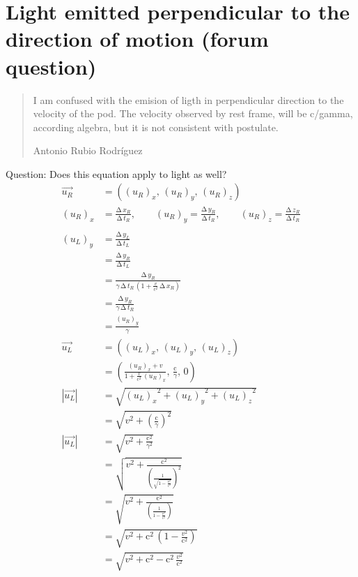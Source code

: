 \documentclass[pagesize,headsepline,10pt,parskip=half]{scrreprt}
\newcommand*\mdelta[1]{\ensuremath{\mathrm{\Delta\,}#1}}
\newcommand{\const}[1]{\mathrm{#1}}
\renewcommand{\c}{\const{c}}
\begin{document}
    \section{Light emitted perpendicular to the direction of motion (forum question)}
      \blockquote[Antonio Rubio Rodríguez]{I am confused with the emision of ligth in perpendicular direction to the velocity of the pod. The velocity observed by rest frame, will be c/gamma, according algebra, but it is not consistent with postulate.}

      Question: Does this equation apply to light as well?
      \begin{align*}
        \vec{u_R} &= \left({(u_R)}_x, \, {(u_R)}_y, \, {(u_R)}_z\right)\\
        {(u_R)}_x &= \frac{\mdelta{x_R}}{\mdelta{t_R}}, \qquad
        {(u_R)}_y = \frac{\mdelta{y_R}}{\mdelta{t_R}}, \qquad
        {(u_R)}_z = \frac{\mdelta{z_R}}{\mdelta{t_R}}\\
        \\
        {(u_L)}_y &= \frac{\mdelta{y_L}}{\mdelta{t_L}}\\
          &= \frac{\mdelta{y_R}}{\mdelta{t_L}}\\
          &= \frac{\mdelta{y_R}}{\gamma \, \mdelta{t_R} \, \left(1 + \frac{v}{\c^2} \, \mdelta{x_R}\right)}\\
          &= \frac{\mdelta{y_R}}{\gamma \, \mdelta{t_R}}\\
          &= \frac{{(u_R)}_y}{\gamma}\\
        \vec{u_L}
          &= \left({(u_L)}_x, \, {(u_L)}_y, \, {(u_L)}_z\right)\\
          &= \left(\frac{{(u_R)}_x + v}{1 + \frac{v}{\c^2} \, {(u_R)}_x}, \, \frac{\c}{\gamma}, \, 0\right)\\
        \left|\vec{u_L}\right|
          &= \sqrt{{{(u_L)}_x}^2 + {{(u_L)}_y}^2 + {{(u_L)}_z}^2}\\
          &= \sqrt{v^2 + {\left(\frac{\c}{\gamma}\right)}^2}\\
        \left|\vec{u_L}\right|
          &= \sqrt{v^2 + \frac{\c^2}{{\gamma}^2}}\\
          &= \sqrt{v^2 + \frac{\c^2}{{\left(\frac{1}{\sqrt{1 - \frac{v^2}{\c^2}}}\right)}^2}}\\
          &= \sqrt{v^2 + \frac{\c^2}{\left(\frac{1}{1 - \frac{v^2}{\c^2}}\right)}}\\
          &= \sqrt{v^2 + \c^2 \, \left(1 - \frac{v^2}{\c^2}\right)}\\
          &= \sqrt{v^2 + \c^2 - \c^2 \, \frac{v^2}{\c^2}}\\

\end{align*}
\end{document}
